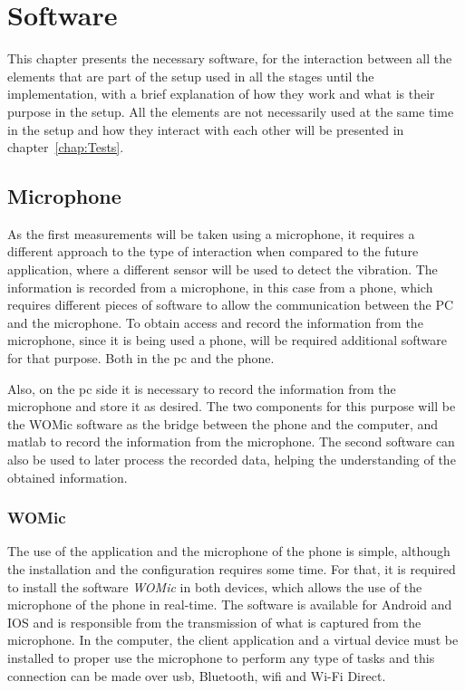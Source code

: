 \cleardoublepage
\chapter{Software}\label{chap:software}

This chapter presents the necessary software, for the interaction between all the elements that are part of the setup used in all the stages until the implementation, with a brief explanation of how they work and what is their purpose in the setup. All the elements are not necessarily used at the same time in the setup and how they interact with each other will be presented in chapter~\ref{chap:Tests}.

\section{Microphone}
As the first measurements will be taken using a microphone, it requires a different approach to the type of interaction when compared to the future application, where a different sensor will be used to detect the vibration. The information is recorded from a microphone, in this case from a phone, which requires different pieces of software to allow the communication between the PC and the microphone. 
To obtain access and record the information from the microphone, since it is being used a phone, will be required additional software for that purpose. Both in the \acrshort{pc} and the phone.

Also, on the \acrshort{pc} side it is necessary to record the information from the microphone and store it as desired. The two components for this purpose will be the WOMic software as the bridge between the phone and the computer, and \acrshort{matlab} to record the information from the microphone. The second software can also be used to later process the recorded data, helping the understanding of the obtained information.
\subsection*{WOMic}
The use of the application and the microphone of the phone is simple, although the installation and the configuration requires some time. For that, it is required to install the software \textit{WOMic} in both devices, which allows the use of the microphone of the phone in real-time. The software is available for Android and IOS and is responsible from the transmission of what is captured from the microphone. In the computer, the client application and a virtual device must be installed to proper use the microphone to perform any type of tasks and this connection can be made over \acrshort{usb}, Bluetooth, \acrshort{wifi} and Wi-Fi Direct.

